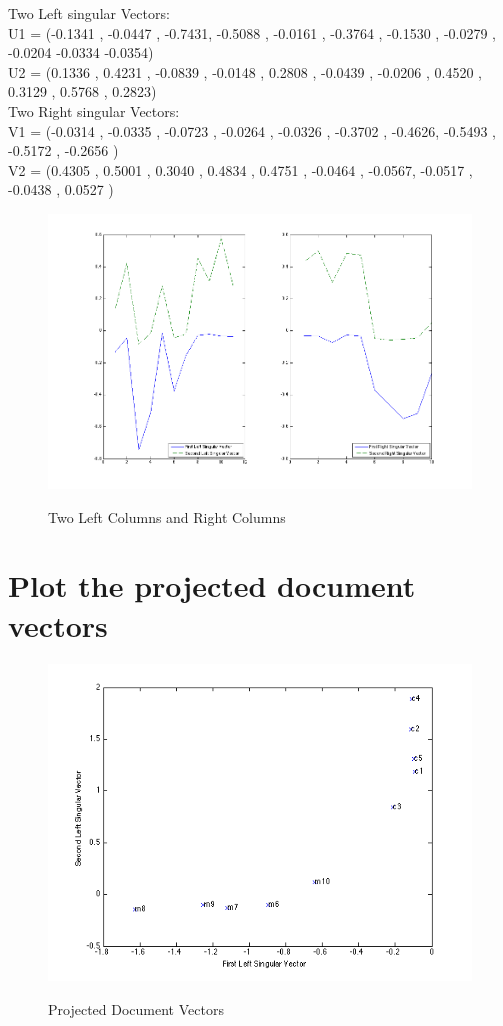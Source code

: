 \documentclass[11pt,a4paper]{article}
\begin{document}
Two Left singular Vectors: \\
U1 = 
(-0.1341 ,  -0.0447 ,  -0.7431,   -0.5088  , -0.0161 ,  -0.3764  , -0.1530 ,
-0.0279  , -0.0204   -0.0334   -0.0354) \\
U2 =
(0.1336 ,   0.4231 ,  -0.0839 ,  -0.0148  ,  0.2808  , -0.0439  , -0.0206 ,
0.4520 ,   0.3129  ,  0.5768  ,  0.2823) \\[0.3cm]
Two Right singular Vectors: \\
V1 = 
(-0.0314 ,  -0.0335  , -0.0723 ,  -0.0264  , -0.0326 ,  -0.3702 ,  -0.4626,
-0.5493  , -0.5172  , -0.2656 )\\
V2 = 
    (0.4305  ,  0.5001 ,   0.3040  ,  0.4834   , 0.4751  , -0.0464 ,  -0.0567,
    -0.0517  , -0.0438  ,  0.0527 )\\

\begin{figure}[h]
    \centering
    \includegraphics[width=6.5in,height=3.in]{./4s.png} \\
    \caption{Two Left Columns and Right Columns}
\end{figure}

\newpage

\section{Plot the projected document vectors}
\begin{figure}[h]
    \centering
    \includegraphics[width=5.5in,height=3.in]{./5s.png} \\
    \caption{Projected Document Vectors}
\end{figure}
\end{document}
